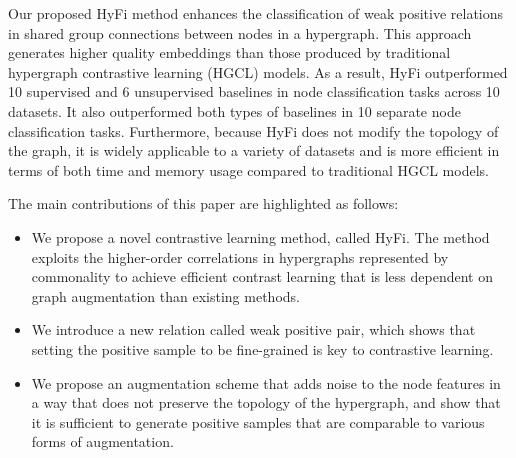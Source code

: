 Our proposed HyFi method enhances the classification of weak positive relations in shared group connections between nodes in a hypergraph. This approach generates higher quality embeddings than those produced by traditional hypergraph contrastive learning (HGCL) models. As a result, HyFi outperformed 10 supervised and 6 unsupervised baselines in node classification tasks across 10 datasets. It also outperformed both types of baselines in 10 separate node classification tasks. Furthermore, because HyFi does not modify the topology of the graph, it is widely applicable to a variety of datasets and is more efficient in terms of both time and memory usage compared to traditional HGCL models.

The main contributions of this paper are highlighted as follows:
\begin{itemize}
    \item We propose a novel  contrastive learning method, called HyFi. The method exploits the higher-order correlations in hypergraphs represented by commonality to achieve efficient contrast learning that is less dependent on graph augmentation than existing methods.
    \item We introduce a new relation called weak positive pair, which shows that setting the positive sample to be fine-grained is key to contrastive learning.
    \item We propose an augmentation scheme that adds noise to the node features in a way that does not preserve the topology of the hypergraph, and show that it is sufficient to generate positive samples that are comparable to various forms of augmentation.
\end{itemize}







